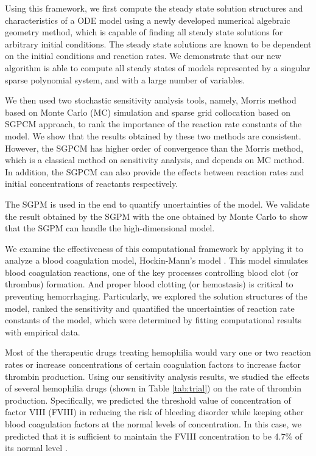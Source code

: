 Using this framework, we first
compute the steady state solution structures and characteristics of
a ODE model using a newly developed numerical algebraic
geometry method, which is capable of  finding all steady state solutions
 for arbitrary initial conditions. The steady state solutions are known to be dependent on
the initial conditions and reaction rates. We demonstrate that our new algorithm
is able to compute all steady states of models
 represented by a singular sparse polynomial system, and with a large number of
variables.


We then used two stochastic  sensitivity analysis tools, namely, Morris method ~\cite{Morris91} based on Monte
Carlo (MC) simulation and sparse grid collocation based on SGPCM
approach, to rank the importance of the reaction rate constants of the model.
We show that the results obtained by these two methods are consistent.
However, the SGPCM has higher order of convergence than
the  Morris method, which is a classical method on sensitivity analysis, and
depends on MC method. In addition, the SGPCM can also provide the effects
between reaction rates and initial concentrations of reactants respectively.

The SGPM is used in the end to quantify uncertainties of the model. We validate the result obtained by the SGPM with the one obtained by Monte Carlo to show that the SGPM can  handle the high-dimensional model.


We  examine the effectiveness of this computational framework by applying it to analyze a blood coagulation model,  Hockin-Mann's model \cite{HocJon02}.  This model simulates blood coagulation
reactions, one of the key processes controlling blood clot (or
thrombus) formation. And proper blood clotting (or hemostasis) is critical to
preventing hemorrhaging. Particularly, we explored the solution structures of the model,
ranked the  sensitivity and quantified the uncertainties of reaction rate constants of the model,  which
were determined by fitting computational results with empirical
data.

Most of the therapeutic drugs treating hemophilia would vary one or
two reaction rates or increase concentrations of certain coagulation factors to increase factor thrombin production. Using our sensitivity analysis results, we
studied the effects of several hemophilia drugs (shown in Table
\ref{tab:trial}) on the rate of thrombin production. Specifically, we
predicted the threshold value of concentration of factor VIII (FVIII) in reducing
the risk of bleeding disorder while keeping other blood coagulation factors at the normal levels of concentration. In this case, we predicted that it is sufficient to
 maintain the FVIII concentration to be 4.7\% of its normal level .



